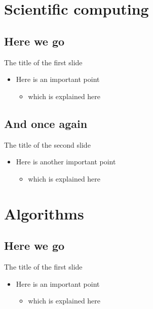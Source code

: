 %
%
%
%


\section{Scientific computing}

\subsection{Here we go}
\begin{frame}{The title of the first slide}

  \begin{itemize}
    \item Here is an important point
      \begin{itemize}
        \item which is explained here
      \end{itemize}
  \end{itemize}
\end{frame}

\subsection{And once again}
\begin{frame}{The title of the second slide}
  \begin{itemize}
    \item Here is another important point
      \begin{itemize}
        \item which is explained here
      \end{itemize}
  \end{itemize}
\end{frame}

\section{Algorithms}

\subsection{Here we go}
\begin{frame}{The title of the first slide}

  \begin{itemize}
    \item Here is an important point
      \begin{itemize}
        \item which is explained here
      \end{itemize}
  \end{itemize}
\end{frame}

